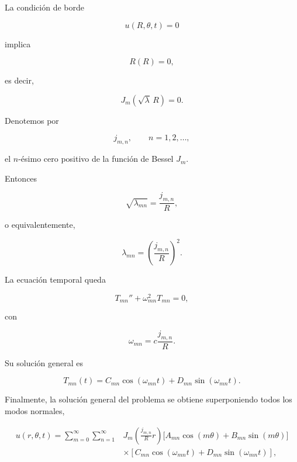 \documentclass[12pt]{article}
\begin{document}
La condición de borde

\[
u(R,\theta,t)=0
\]

implica

\[
R(R)=0,
\]

es decir,

\begin{equation}
J_m(\sqrt{\lambda}\,R)=0.
\end{equation}

Denotemos por

\[
j_{m,n},
\qquad
n=1,2,\ldots,
\]

el $n$-ésimo cero positivo de la función de Bessel $J_m$.

Entonces

\begin{equation}
\sqrt{\lambda_{mn}}
=
\frac{j_{m,n}}{R},
\end{equation}

o equivalentemente,

\begin{equation}
\boxed{
\lambda_{mn}
=
\left(
\frac{j_{m,n}}{R}
\right)^2.
}
\end{equation}

La ecuación temporal queda

\begin{equation}
T_{mn}''
+\omega_{mn}^2T_{mn}=0,
\end{equation}

con

\begin{equation}
\omega_{mn}
=
c
\frac{j_{m,n}}{R}.
\end{equation}

Su solución general es

\begin{equation}
T_{mn}(t)
=
C_{mn}\cos(\omega_{mn}t)
+
D_{mn}\sin(\omega_{mn}t).
\end{equation}

Finalmente, la solución general del problema se obtiene superponiendo todos los modos normales,

\begin{equation}
\boxed{
\begin{aligned}
u(r,\theta,t)
=
\sum_{m=0}^{\infty}
\sum_{n=1}^{\infty}
&
J_m
\!\left(
\frac{j_{m,n}}{R}r
\right)
\Big[
A_{mn}\cos(m\theta)
+
B_{mn}\sin(m\theta)
\Big]
\\
&\times
\left[
C_{mn}\cos(\omega_{mn}t)
+
D_{mn}\sin(\omega_{mn}t)
\right],
\end{aligned}
}
\end{equation}
\end{document}
